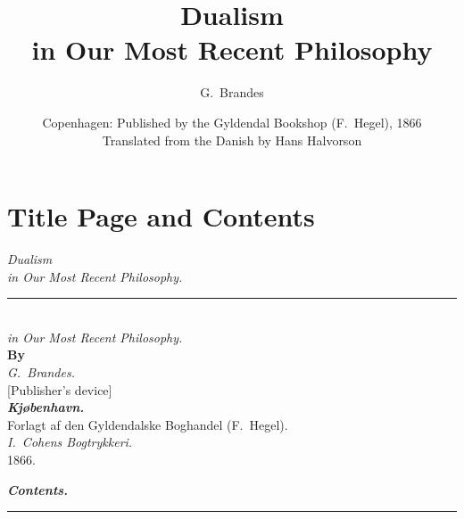 \documentclass[12pt,a4paper]{book}
\title{\textbf{Dualism}\\[6pt]
  \large in Our Most Recent Philosophy}
\author{G.\ Brandes}
\date{Copenhagen: Published by the Gyldendal Bookshop (F.\ Hegel), 1866\\[10pt]
  \small Translated from the Danish by Hans Halvorson}
\newcommand{\opage}[1]{\marginnote{\footnotesize\textit{[#1]}}}
\begin{document}
\maketitle
\thispagestyle{empty}
\newpage

\tableofcontents
\newpage

\chapter*{Title Page and Contents}
\label{ch:prelim}

\begin{center}
\opage{1}\emph{\Large Dualism}\\[10pt]
\emph{in Our Most Recent Philosophy.}\\[14pt]
\rule{2cm}{0.4pt}
\end{center}

\opage{2}

\begin{center}
\opage{3}{\Large\textbf{Dualism}}\\[10pt]
\emph{in Our Most Recent Philosophy.}\\[14pt]
\textbf{By}\\[10pt]
\emph{G.\ Brandes.}\\[16pt]
[Publisher's device]\\[16pt]
\emph{\textbf{Kjøbenhavn.}}\\[4pt]
Forlagt af den Gyldendalske Boghandel (F.\ Hegel).\\[4pt]
{\small\emph{I.\ Cohens Bogtrykkeri.}}\\[6pt]
1866.
\end{center}

\opage{4}

\begin{center}
\opage{5}\emph{\textbf{Contents.}}\\[4pt]
\rule{1.5cm}{0.4pt}
\end{center}
\end{document}
